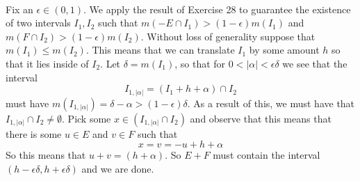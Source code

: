 \documentclass{article}
\newcommand{\problem}[1]{\noindent{\textbf{Problem #1}}\\}
\begin{document}
\problem{1.6.30} 
Fix an $\epsilon \in (0,1)$. We apply the result of Exercise 28 to guarantee the existence of two intervals $I_1,I_2$ such that $m(-E\cap I_1) > (1-\epsilon)m(I_1)$ and  $m(F \cap I_2) > (1-\epsilon)m(I_2)$. Without loss of generality suppose that $m(I_1) \leq m(I_2)$. This means that we can translate $I_1$ by some amount $h$ so that it lies inside of $I_2$. Let $\delta = m(I_1)$, so that for $0 < |\alpha | < \epsilon\delta$ we see that the interval
\[
I_{1,|\alpha |} = (I_1 + h + \alpha) \cap I_2 
\]
must have $m(I_{1,|\alpha |}) = \delta - \alpha > (1-\epsilon)\delta$. As a result of this, we must have that $I_{1,|\alpha|} \cap I_2 \neq \emptyset$. Pick some $x \in (I_{1,|\alpha|} \cap I_2)$ and observe that this means that there is some $u \in E$ and $v \in F$ such that 
\[
x = v = -u + h + \alpha 
\]
So this means that $u + v = (h+\alpha)$. So $E+F$ must contain the interval $(h - \epsilon\delta, h+ \epsilon\delta)$ and we are done. 
\pagebreak
\end{document}

